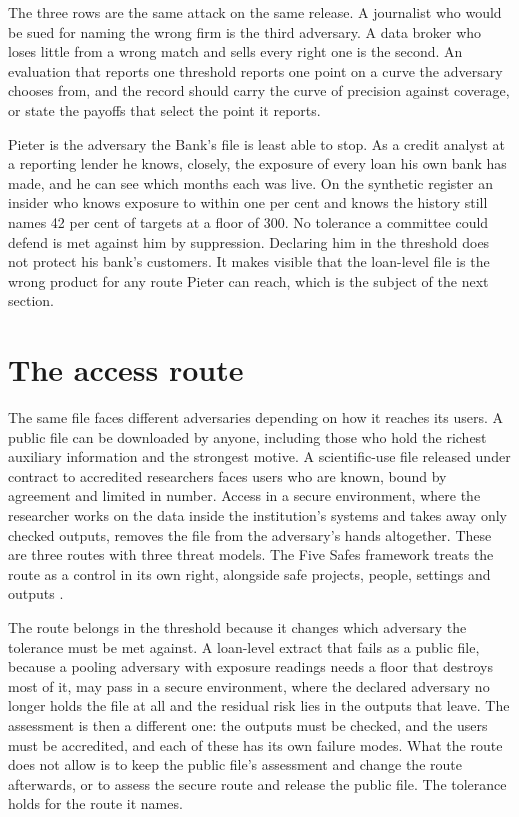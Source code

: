 The three rows are the same attack on the same release. A journalist who would be
sued for naming the wrong firm is the third adversary. A data broker who loses
little from a wrong match and sells every right one is the second. An evaluation
that reports one threshold reports one point on a curve the adversary chooses from,
and the record should carry the curve of precision against coverage, or state the
payoffs that select the point it reports.

Pieter is the adversary the Bank's file is least able to stop. As a credit analyst
at a reporting lender he knows, closely, the exposure of every loan his own bank
has made, and he can see which months each was live. On the synthetic register an
insider who knows exposure to within one per cent and knows the history still
names 42 per cent of targets at a floor of 300.
No tolerance a committee could defend is met against him by suppression. Declaring
him in the threshold does not protect his bank's customers. It makes visible that
the loan-level file is the wrong product for any route Pieter can reach, which is
the subject of the next section.

\section{The access route}\label{c07:sec-route}

The same file faces different adversaries depending on how it reaches its users.
A public file can be downloaded by anyone, including those who hold the richest
auxiliary information and the strongest motive. A scientific-use file released
under contract to accredited researchers faces users who are known, bound by
agreement and limited in number. Access in a secure environment, where the
researcher works on the data inside the institution's systems and takes away only
checked outputs, removes the file from the adversary's hands altogether. These are
three routes with three threat models. The Five Safes framework treats the route as
a control in its own right, alongside safe projects, people, settings and outputs
\citep{desai2016}.

The route belongs in the threshold because it changes which adversary the
tolerance must be met against. A loan-level extract that fails as a public file,
because a pooling adversary with exposure readings needs a floor that destroys most
of it, may pass in a secure environment, where the declared adversary no longer
holds the file at all and the residual risk lies in the outputs that leave. The
assessment is then a different one: the outputs must be checked, and the users
must be accredited, and each of these has its own failure modes. What the route
does not allow is to keep the public file's assessment and change the route
afterwards, or to assess the secure route and release the public file. The
tolerance holds for the route it names.

